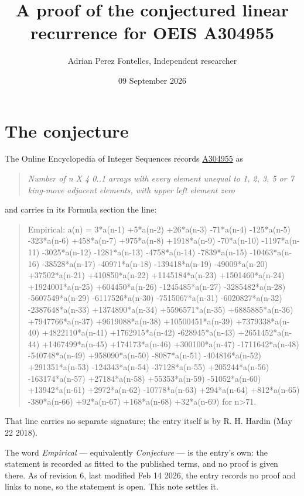\documentclass[11pt]{article}
\title{A proof of the conjectured linear recurrence for OEIS A304955}
\author{Adrian Perez Fontelles, Independent researcher}
\date{09 September 2026}
\theoremstyle{definition}
\begin{document}
\maketitle
\section{The conjecture}

The Online Encyclopedia of Integer Sequences records \href{https://oeis.org/A304955}{A304955} as

\begin{quote}\itshape Number of n X 4 0..1 arrays with every element unequal to 1, 2, 3, 5 or 7 king-move adjacent elements, with upper left element zero\end{quote}

and carries in its Formula section the line:

\begin{quote}\ttfamily Empirical: a(n) = 3*a(n-1) +5*a(n-2) +26*a(n-3) -71*a(n-4) -125*a(n-5) -323*a(n-6) +458*a(n-7) +975*a(n-8) +1918*a(n-9) -70*a(n-10) -1197*a(n-11) -3025*a(n-12) -1281*a(n-13) -4758*a(n-14) -7839*a(n-15) -10463*a(n-16) -38528*a(n-17) -40971*a(n-18) -139418*a(n-19) -49009*a(n-20) +37502*a(n-21) +410850*a(n-22) +1145184*a(n-23) +1501460*a(n-24) +1924001*a(n-25) +604450*a(n-26) -1245485*a(n-27) -3285482*a(n-28) -5607549*a(n-29) -6117526*a(n-30) -7515067*a(n-31) -6020827*a(n-32) -2387648*a(n-33) +1374890*a(n-34) +5596571*a(n-35) +6885885*a(n-36) +7947766*a(n-37) +9619088*a(n-38) +10500451*a(n-39) +7379338*a(n-40) +4822110*a(n-41) +1762915*a(n-42) -628945*a(n-43) +2651452*a(n-44) +1467499*a(n-45) +174173*a(n-46) +300100*a(n-47) -1711642*a(n-48) -540748*a(n-49) +958090*a(n-50) -8087*a(n-51) -404816*a(n-52) +291351*a(n-53) -124343*a(n-54) -37128*a(n-55) +205244*a(n-56) -163174*a(n-57) +27184*a(n-58) +55353*a(n-59) -51052*a(n-60) +13942*a(n-61) +2972*a(n-62) -10778*a(n-63) +294*a(n-64) +812*a(n-65) -380*a(n-66) +92*a(n-67) +168*a(n-68) +32*a(n-69) for n>71.\end{quote}

That line carries no separate signature; the entry itself is by R. H. Hardin (May 22 2018).

The word {\itshape Empirical} --- equivalently {\itshape Conjecture} --- is the entry's own: the statement is recorded as fitted to the published terms, and no proof is given there. As of revision 6, last modified Feb 14 2026, the entry records no proof and links to none, so the statement is open. This note settles it.
\end{document}
